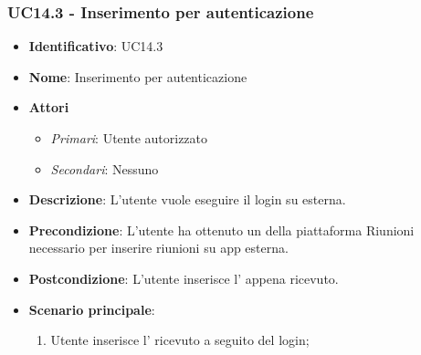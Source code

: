 \subsubsection{UC14.3 - Inserimento  per autenticazione }
\begin{itemize}
	\item \textbf{Identificativo}: UC14.3
	\item \textbf{Nome}: Inserimento  per autenticazione
	\item \textbf{Attori}
	\begin{itemize} 
		\item \textit{Primari}: Utente autorizzato
		\item \textit{Secondari}: Nessuno
	\end{itemize}
	\item \textbf{Descrizione}: L'utente vuole eseguire il login su  esterna.
	\item \textbf{Precondizione}: L'utente ha ottenuto un  della piattaforma Riunioni necessario per inserire riunioni su app esterna.
	\item \textbf{Postcondizione}: L'utente inserisce l' appena ricevuto.
	\item \textbf{Scenario principale}: \begin{enumerate}
		\item Utente inserisce l' ricevuto a seguito del login; 
	\end{enumerate}
\end{itemize}

